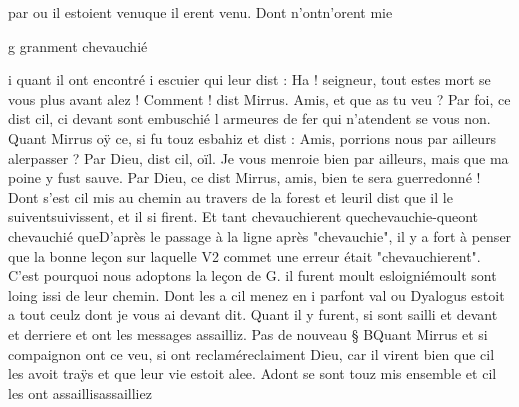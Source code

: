\documentclass{article}
\begin{document}
\begin{pages}
                         par ou il estoient venuque il erent venu. Dont 
                  n’ontn'orent mie 
                  
                  g granment chevauchié 
                  
                  i quant il ont encontré i escuier qui leur dist : Ha ! seigneur, tout estes mort se vous plus avant alez !
               Comment ! dist Mirrus. Amis, et que as tu veu ?
               Par foi, 
                     ce dist cil, ci devant sont embuschié l armeures de fer qui
                  n’atendent se vous non. Quant Mirrus oÿ
               ce, si fu touz esbahiz et dist : Amis, porrions nous
                  par ailleurs 
                     alerpasser ?
               Par Dieu, dist cil, oïl. Je vous menroie bien par
                  ailleurs, mais que ma poine y fust sauve.
               Par Dieu, 
                     ce dist Mirrus, amis, bien te sera
                  guerredonné ! Dont s’est cil mis au chemin au travers 
                  de la forest et 
                  leuril dist que il le 
                     suiventsuivissent, et il si firent. Et tant 
                  chevauchierent quechevauchie-queont chevauchié queD'après le passage à la ligne après "chevauchie", il
                  y a fort à penser que la bonne leçon sur laquelle V2 commet une erreur était
                  "chevauchierent". C'est pourquoi nous adoptons la leçon de G. il 
                  furent moult esloigniémoult sont loing issi de leur chemin. Dont les a cil menez en i parfont val ou Dyalogus estoit a tout ceulz dont je
                  vous ai devant dit. Quant il y furent, si sont sailli et devant et derriere
               et ont les messages assailliz. \pend
            \pstart Pas de nouveau § BQuant
                  Mirrus et si compaignon ont ce veu, si 
                  ont reclaméreclaiment Dieu, car il virent bien que cil les avoit traÿs et que leur vie estoit alee.
               Adont se sont touz mis ensemble et cil les ont 
                  assaillisassailliez
               

\end{pages}
\end{document}
